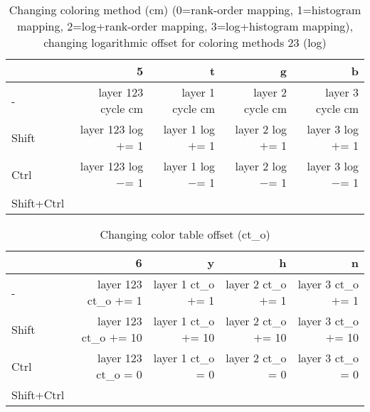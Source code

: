 \documentclass[10pt,a4paper]{article}
\begin{document}
\begin{table}[h!]
    \caption{Changing coloring method (cm) (0=rank-order mapping, 1=histogram mapping, 2=log+rank-order mapping, 3=log+histogram mapping), changing logarithmic offset for coloring methods 23 (log)}
    \setlength{\tabcolsep}{0.0pt}
    \begin{tabularx}{\linewidth}{lRRRR}
        \toprule
                   & 5                    & t                  & g                  & b                  \\
        \midrule                                                                          
        -          & layer 123 cycle cm   & layer 1 cycle cm   & layer 2 cycle cm   & layer 3 cycle cm   \\
        Shift      & layer 123 log $+$= 1 & layer 1 log $+$= 1 & layer 2 log $+$= 1 & layer 3 log $+$= 1 \\
        Ctrl       & layer 123 log $-$= 1 & layer 1 log $-$= 1 & layer 2 log $-$= 1 & layer 3 log $-$= 1 \\
        Shift+Ctrl &                      &                    &                    &                    \\
        \bottomrule
    \end{tabularx}
\end{table}

\begin{table}[h!]
    \caption{Changing color table offset (ct\_o)}
    \setlength{\tabcolsep}{0.0pt}
    \begin{tabularx}{\linewidth}{lRRRR}
        \toprule
                   & 6                       & y                     & h                     & n                     \\
        \midrule                                                                          
        -          & layer 123 ct\_o $+$= 1  & layer 1 ct\_o $+$= 1  & layer 2 ct\_o $+$= 1  & layer 3 ct\_o $+$= 1  \\
        Shift      & layer 123 ct\_o $+$= 10 & layer 1 ct\_o $+$= 10 & layer 2 ct\_o $+$= 10 & layer 3 ct\_o $+$= 10 \\
        Ctrl       & layer 123 ct\_o = 0     & layer 1 ct\_o = 0     & layer 2 ct\_o = 0     & layer 3 ct\_o = 0     \\
        Shift+Ctrl &                         &                       &                       &                       \\
        \bottomrule
    \end{tabularx}
\end{table}
\end{document}
